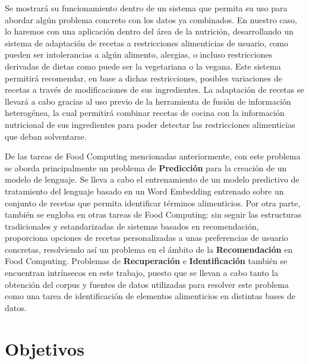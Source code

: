 
Se mostrará su funcionamiento dentro de un sistema que permita su uso para abordar algún problema concreto con los datos ya combinados. En nuestro caso, lo haremos con una aplicación dentro del área de la nutrición, desarrollando un sistema de adaptación de recetas a restricciones alimenticias de usuario, como pueden ser intolerancias a algún alimento, alergias, o incluso restricciones derivadas de dietas como puede ser la vegetariana o la vegana. Este sistema permitirá recomendar, en base a dichas restricciones, posibles variaciones de recetas a través de modificaciones de sus ingredientes. La adaptación de recetas se llevará a cabo gracias al uso previo de la herramienta de fusión de información heterogénea, la cual permitirá combinar recetas de cocina con la información nutricional de sus ingredientes para poder detectar las restricciones alimenticias que deban solventarse.

De las tareas de Food Computing mencionadas anteriormente, con este problema se aborda principalmente un problema de \textbf{Predicción} para la creación de un modelo de lenguaje. Se lleva a cabo el entrenamiento de un modelo predictivo de tratamiento del lenguaje basado en un Word Embedding entrenado sobre un conjunto de recetas que permita identificar términos alimenticios. Por otra parte, también se engloba en otras tareas de Food Computing: sin seguir las estructuras tradicionales y estandarizadas de sistemas basados en recomendación, proporciona opciones de recetas personalizadas a unas preferencias de usuario concretas, resolviendo así un problema en el ámbito de la \textbf{Recomendación} en Food Computing. Problemas de \textbf{Recuperación} e \textbf{Identificación} también se encuentran intrínsecos en este trabajo, puesto que se llevan a cabo tanto la obtención del corpus y fuentes de datos utilizadas para resolver este problema como una tarea de identificación de elementos alimenticios en distintas bases de datos.

\section{Objetivos}\label{sec:objetivos}

